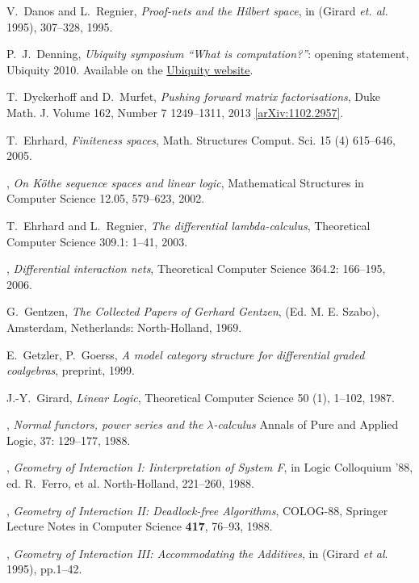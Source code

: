 \documentclass[english,letter paper,12pt,reqno]{article}
\theoremstyle{example}
\numberwithin{equation}{section}
\begin{document}
\begin{thebibliography}{BHLS03}
V.~Danos and L.~Regnier, \textsl{Proof-nets and the Hilbert space}, in (Girard \textsl{et. al.} 1995), 307--328, 1995.

P.~J.~Denning, \textsl{Ubiquity symposium ``What is computation?''}: opening statement, Ubiquity 2010. Available on the \href{http://ubiquity.acm.org/article.cfm?id=1870596}{Ubiquity website}.

T.~Dyckerhoff and D.~Murfet, \textsl{Pushing forward matrix factorisations}, Duke Math. J. Volume 162, Number 7 1249--1311, 2013 \href{http://arxiv.org/abs/1102.2957}{[arXiv:1102.2957]}.

T.~Ehrhard, \textsl{Finiteness spaces}, Math. Structures Comput. Sci. 15 (4) 615--646, 2005.

\bysame, \textsl{On {K}\"othe sequence spaces and linear logic}, Mathematical Structures in Computer Science 12.05, 579--623, 2002.

T.~Ehrhard and L.~Regnier, \textsl{The differential lambda-calculus}, Theoretical Computer Science 309.1: 1--41, 2003.

\bysame, \textsl{Differential interaction nets}, Theoretical Computer Science 364.2: 166--195, 2006.

G.~Gentzen, \textsl{The Collected Papers of Gerhard Gentzen}, (Ed. M. E. Szabo), Amsterdam, Netherlands: North-Holland, 1969.

E.~Getzler, P.~Goerss, \emph{A model category structure for differential graded coalgebras}, preprint, 1999.
  
J.-Y.~Girard, \textsl{Linear Logic}, Theoretical Computer Science 50 (1), 1--102, 1987.

\bysame, \textsl{Normal functors, power series and the $\lambda$-calculus} Annals of Pure and Applied
Logic, 37: 129--177, 1988.

\bysame, \textsl{Geometry of {I}nteraction I: {I}interpretation of {S}ystem {F}}, in Logic Colloquium '88, ed. R.~Ferro, et al. North-Holland, 221--260, 1988.

\bysame, \textsl{Geometry of {I}nteraction II: {D}eadlock-free {A}lgorithms}, COLOG-88, Springer Lecture Notes in Computer Science \textbf{417}, 76--93, 1988.

\bysame, \textsl{Geometry of {I}nteraction III: {A}ccommodating the {A}dditives}, in (Girard \textsl{et al}. 1995), pp.1--42.


\end{thebibliography}
\end{document}
